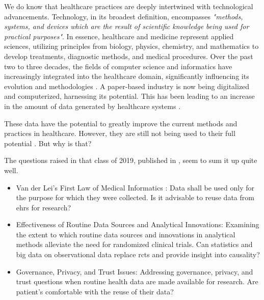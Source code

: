 
We do know that healthcare practices are deeply intertwined with technological advancements. Technology, in its broadest definition, encompasses \textit{"methods, systems, and devices which are the result of scientific knowledge being used for practical purposes"}. In essence, healthcare and medicine represent applied sciences, utilizing principles from biology, physics, chemistry, and mathematics to develop treatments, diagnostic methods, and medical procedures. Over the past two to three decades, the fields of computer science and informatics have increasingly integrated into the healthcare domain, significantly influencing its evolution and methodologies \cite{adler-milsteinHITECHActDrove2017}. A paper-based industry is now being digitalized and computerized, harnessing its potential. This has been leading to an increase in the amount of data generated by healthcare systems \cite{kruseUseElectronicHealth2018,palabindalaAdoptionElectronicHealth2016}.

These data have the potential to greatly improve the current methods and practices in healthcare. However, they are still not being used to their full potential \cite{kruseUseElectronicHealth2018,dicamilloGuestEditorialData2020}. But why is that?

The questions raised in that class of 2019, published in \cite{peekThreeControversiesHealth2018}, seem to sum it up quite well.

\begin{itemize}
    \item Van der Lei’s First Law of Medical Informatics \cite{vanderleiUseAbuseComputerstored1991}: Data shall be used only for the purpose for which they were collected. Is it advisable to reuse data from \acp{ehr} for research?
    \item Effectiveness of Routine Data Sources and Analytical Innovations: Examining the extent to which routine data sources and innovations in analytical methods alleviate the need for randomized clinical trials. Can statistics and big data on observational data replace \acp{rct} and provide insight into causality?
    \item Governance, Privacy, and Trust Issues: Addressing governance, privacy, and trust questions when routine health data are made available for research. Are patient's comfortable with the reuse of their data?

\end{itemize}



